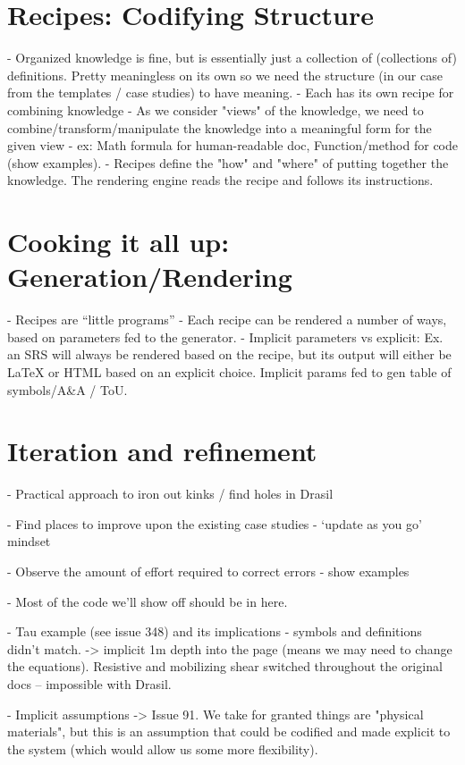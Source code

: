 \section{Recipes: Codifying Structure}
  - Organized knowledge is fine, but is essentially just a collection of (collections of) definitions. Pretty meaningless on its own so we need the structure (in our case from the templates / case studies) to have meaning.
  - Each \sf{} has its own recipe for combining knowledge
  - As we consider \sfs{} "views" of the knowledge, we need to 
  combine/transform/manipulate the knowledge into a meaningful form for the 
  given view - ex: Math formula for human-readable doc, Function/method for 
  code (show examples).
  - Recipes define the "how" and "where" of putting together the knowledge. The rendering engine reads the recipe and follows its instructions.

\section{Cooking it all up: Generation/Rendering}
  - Recipes are “little programs”
  - Each recipe can be rendered a number of ways, based on parameters fed to the generator.
  -  Implicit parameters vs explicit: Ex. an SRS will always be rendered based on the recipe, but its output will either be LaTeX or HTML based on an explicit choice. Implicit params fed to gen table of symbols/A\&A / ToU.


\section{Iteration and refinement}

  - Practical approach to iron out kinks / find holes in Drasil

  - Find places to improve upon the existing case studies - ‘update as you go’ 
  mindset

  - Observe the amount of effort required to correct errors - show examples

  - Most of the code we’ll show off should be in here.

  - Tau example (see issue 348) and its implications - symbols and definitions 
  didn't match. -> implicit 1m depth into the page (means we may need to change 
  the equations). Resistive and mobilizing shear switched throughout the 
  original docs -- impossible with Drasil.

  -  Implicit assumptions -> 
  Issue 91. We take for granted things are "physical 
  materials", but this is an assumption that could be codified and made 
  explicit to the system (which would allow us some more flexibility).